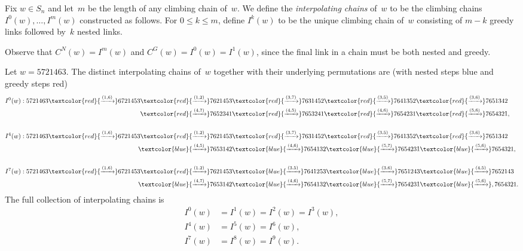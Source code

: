\documentclass[ALCO]{cedram}
\newcommand{\CG}{C^G}
\newcommand{\CN}{C^N}
\begin{document}
\begin{definition}
	\label{def:interpolatingchains}
	Fix $w\in S_n$ and let~$m$ be the length of any climbing chain of~$w$. We define the \emph{interpolating chains} of~$w$ to be the climbing chains $I^0(w),\ldots,I^m(w)$ constructed as follows. 
	For $0\leq k\leq m$, define $I^k(w)$ to be the unique climbing chain of~$w$ consisting of $m-k$ greedy links followed by~$k$ nested links.
\end{definition}

Observe that $\CN(w) = I^m(w)$ and $\CG(w) = I^{0}(w) = I^{1}(w)$, since the final link in a chain must be both nested and greedy.

	
	
	
		
		
		
		
		
	
	

\begin{example}
	\label{exp:5721463intchains}
	Let $w=5721463$. The distinct interpolating chains of~$w$ together with their underlying permutations are (with nested steps blue and greedy steps red)
	\begin{align*}
		I^0(w): 5721463 \textcolor{red}{\xrightarrow{(1,6)}} 6721453
		\textcolor{red}{\xrightarrow{(1,2)}} 7621453
		&\textcolor{red}{\xrightarrow{(3,7)}} 7631452
		\textcolor{red}{\xrightarrow{(3,5)}} 7641352
		\textcolor{red}{\xrightarrow{(3,6)}} 7651342\\ 
		\textcolor{red}{\xrightarrow{(4,7)}} 7652341
		&\textcolor{red}{\xrightarrow{(4,5)}} 7653241
		\textcolor{red}{\xrightarrow{(4,6)}} 7654231
		\textcolor{red}{\xrightarrow{(5,6)}} 7654321,\\
		\phantom{a}\\
		I^4(w): 5721463 \textcolor{red}{\xrightarrow{(1,6)}} 6721453
		\textcolor{red}{\xrightarrow{(1,2)}} 7621453
		&\textcolor{red}{\xrightarrow{(3,7)}} 7631452
		\textcolor{red}{\xrightarrow{(3,5)}} 7641352
		\textcolor{red}{\xrightarrow{(3,6)}} 7651342\\ 
		\textcolor{blue}{\xrightarrow{(4,5)}} 7653142
		&\textcolor{blue}{\xrightarrow{(4,6)}} 7654132
		\textcolor{blue}{\xrightarrow{(5,7)}} 7654231
		\textcolor{blue}{\xrightarrow{(5,6)}} 7654321,\\
		\phantom{a}\\
		I^7(w): 5721463 \textcolor{red}{\xrightarrow{(1,6)}} 6721453
		\textcolor{red}{\xrightarrow{(1,2)}} 7621453
		&\textcolor{blue}{\xrightarrow{(3,5)}} 7641253
		\textcolor{blue}{\xrightarrow{(3,6)}} 7651243
		\textcolor{blue}{\xrightarrow{(4,5)}} 7652143\\ 
		\textcolor{blue}{\xrightarrow{(4,7)}} 7653142
		&\textcolor{blue}{\xrightarrow{(4,6)}} 7654132
		\textcolor{blue}{\xrightarrow{(5,7)}} 7654231
		\textcolor{blue}{\xrightarrow{(5,6)}} ,7654321.
	\end{align*}
	The full collection of interpolating chains is 
	\begin{align*}
		I^0(w)&=I^1(w)=I^2(w)=I^3(w),\\
		I^4(w)&=I^5(w)=I^6(w),\\
		I^7(w)&=I^8(w)=I^9(w).
	\end{align*}
\end{example}
\end{document}
